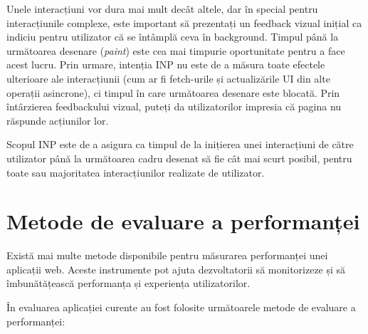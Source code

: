 \documentclass[12pt, a4paper]{report}
\begin{document}
\begin{itemize}
	      Unele interacțiuni vor dura mai mult decât altele, dar în special pentru interacțiunile complexe, este important să prezentați un feedback vizual inițial ca indiciu pentru utilizator că se întâmplă ceva în background. Timpul până la următoarea desenare (\emph{paint}) este cea mai timpurie oportunitate pentru a face acest lucru. Prin urmare, intenția INP nu este de a măsura toate efectele ulterioare ale interacțiunii (cum ar fi fetch-urile și actualizările UI din alte operații asincrone), ci timpul în care următoarea desenare este blocată. Prin întârzierea feedbackului vizual, puteți da utilizatorilor impresia că pagina nu răspunde acțiunilor lor.

	      Scopul INP este de a asigura ca timpul de la inițierea unei interacțiuni de către utilizator până la următoarea cadru desenat să fie cât mai scurt posibil, pentru toate sau majoritatea interacțiunilor realizate de utilizator.
\end{itemize}

\section{Metode de evaluare a performanței}

Există mai multe metode disponibile pentru măsurarea performanței unei aplicații web. Aceste instrumente pot ajuta dezvoltatorii să monitorizeze și să îmbunătățească performanța și experiența utilizatorilor.

În evaluarea aplicației curente au fost folosite următoarele metode de evaluare a performanței:
\end{document}
